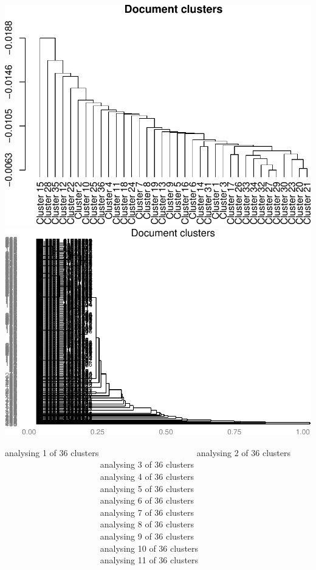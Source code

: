 \documentclass[10pt]{article}
\newenvironment{CodeChunk}{}{}
\begin{document}
\begin{CodeChunk}
\begin{CodeChunk}
\includegraphics{509Assignment_files/figure-latex/onegram3-1} 
\includegraphics{509Assignment_files/figure-latex/onegram3-2} \begin{CodeOutput}
analysing 1 of 36 clusters
analysing 2 of 36 clusters
analysing 3 of 36 clusters
analysing 4 of 36 clusters
analysing 5 of 36 clusters
analysing 6 of 36 clusters
analysing 7 of 36 clusters
analysing 8 of 36 clusters
analysing 9 of 36 clusters
analysing 10 of 36 clusters
analysing 11 of 36 clusters

\end{CodeOutput}
\end{CodeChunk}
\end{CodeChunk}
\end{document}
